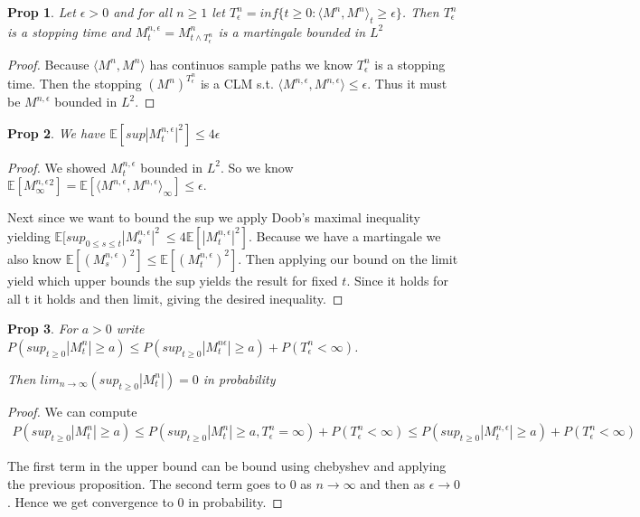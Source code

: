 \documentclass[11pt]{article}
\newcommand{\E}{\mathbb{E}}
\newtheorem{prop}{Prop}
\begin{document}
\begin{prop}
	Let $\epsilon > 0$ and for all $n \geq 1$ let $T_{\epsilon}^n = inf\{t \geq 0 : \langle M^n, M^n \rangle_t \geq \epsilon\}$. Then $T_{\epsilon}^n$ is a stopping time and $M_t^{n,\epsilon} = M_{t \wedge T_{\epsilon}^n}^n$ is a martingale bounded in $L^2$
\end{prop}

\begin{proof}
	Because $\langle M^n, M^n \rangle$ has continuos sample paths we know $T_{\epsilon}^n$ is a stopping time. Then the stopping $(M^n)^{T_{\epsilon}^n}$ is a CLM s.t. $\langle M^{n,\epsilon},M^{n,\epsilon}\rangle \leq \epsilon$. Thus it must be $M^{n,\epsilon}$ bounded in $L^2$. 
\end{proof}

\begin{prop}
	We have $\E[sup|M_t^{n,\epsilon}|^2] \leq 4 \epsilon$
\end{prop}

\begin{proof}
	We showed $M_t^{n,\epsilon}$ bounded in $L^2$. So we know $\E[M_{\infty}^{n,\epsilon}^2] = \E[\langle M^{n,\epsilon},M^{n,\epsilon}\rangle_{\infty}] \leq \epsilon$. 

	Next since we want to bound the sup we apply Doob's maximal inequality yielding $\E[sup_{0 \leq s \leq t} |M_s^{n,\epsilon}|^2\ \leq 4 \E[|M_t^{n,\epsilon}|^2]$. Because we have a martingale we also know $\E[(M_s^{n,\epsilon})^2] \leq \E[(M_t^{n,\epsilon})^2]$. Then applying our bound on the limit yield which upper bounds the sup yields the result for fixed $t$. Since it holds for all t it holds and then limit, giving the desired inequality.
\end{proof}

\begin{prop}
	For $a > 0$ write $P(sup_{t \geq 0}|M_t^n|\geq a) \leq P(sup_{t \geq 0} |M_t^{n\epsilon}| \geq a) + P(T_{\epsilon}^n < \infty)$.

	Then $lim_{n \to \infty} (sup_{t \geq 0}|M_t^n|) = 0$ in probability
\end{prop}

\begin{proof}
	We can compute
	\begin{align*}
		P(sup_{t \geq 0}|M_t^n| \geq a) \leq P(sup_{t \geq 0}|M_t^n| \geq a, T_{\epsilon}^n = \infty) + P(T_{\epsilon}^n < \infty) \leq P(sup_{t \geq 0} |M_t^{n,\epsilon}| \geq a) + P(T_{\epsilon}^n < \infty)
	\end{align*}

	The first term in the upper bound can be bound using chebyshev and applying the previous proposition. The second term goes to 0 as $n \to \infty$ and then as $\epsilon \to 0$. Hence we get convergence to 0 in probability.
\end{proof}
\end{document}
